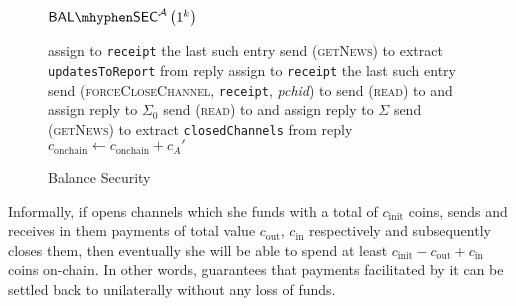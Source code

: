 \begin{figure}[!htbp]
\begin{gamebox}{$\mathsf{BAL \mhyphen SEC}^{\adversary}\left(1^k\right)$}
\begin{algorithmic}[1]
                 \State assign to \texttt{receipt} the last such entry
              \EndIf
            \EndIf
          \EndFor
          \Statex
          \State {}
          \State send (\textsc{getNews}) to \alice{}
          \State extract \texttt{updatesToReport} from reply
             \State assign to \texttt{receipt} the last such entry
          \EndIf
          \State send (\textsc{forceCloseChannel}, \texttt{receipt},
          \textit{pchid}) to \alice
          \State send (\textsc{read}) to \ledger{} and assign reply to
          $\Sigma_0$
          \Repeat
          \label{game:bal-sec:closeloop}
            \State send (\textsc{read}) to \ledger{} and assign reply to
            $\Sigma$
          \State send (\textsc{getNews}) to \alice{}
          \State extract \texttt{closedChannels} from reply
            \State {}
          \EndIf
            \State {}
          \EndIf
          \State $c_{\mathrm{onchain}} \gets c_{\mathrm{onchain}} + c_A'$
        \EndProcedure
      \end{algorithmic}
    \end{gamebox}
    \caption{Balance Security}
    \label{game:bal-sec}
  \end{figure}

  Informally, if \alice{} opens channels which she funds with a total of
  $c_{\mathrm{init}}$ coins, sends and receives in them payments of total value
  $c_{\mathrm{out}}$, $c_{\mathrm{in}}$ respectively and subsequently closes
  them, then eventually she will be able to spend at least $c_{\mathrm{init}} -
  c_{\mathrm{out}} + c_{\mathrm{in}}$ coins on-chain. In other words, \fpaynet{}
  guarantees that payments facilitated by it can be settled back to \ledger{}
  unilaterally without any loss of funds.
